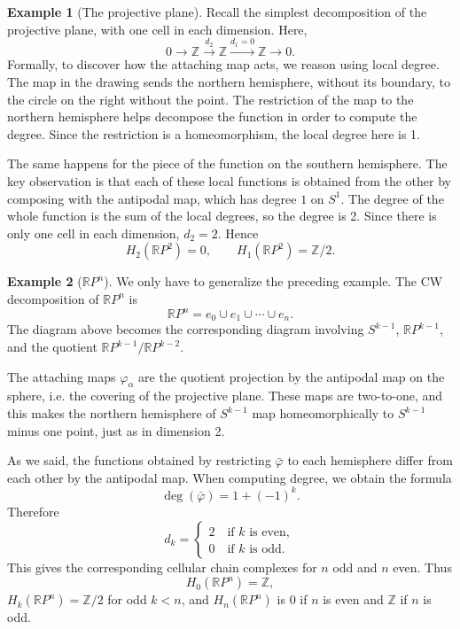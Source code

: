 \documentclass{book}
\theoremstyle{definition}
\newtheorem*{ejem}{Example}
\newcommand{\R}{\mathbb{R}}
\newcommand{\Z}{\mathbb{Z}}
\begin{document}
\begin{ejem}[The projective plane]
Recall the simplest decomposition of the projective plane,
with one cell in each dimension. Here,
$$
0\to\Z\xrightarrow{d_2}\Z\xrightarrow{d_1=0}\Z\to0.
$$
Formally, to discover how the attaching map acts, we reason
using local degree. The map in the drawing sends the northern
hemisphere, without its boundary, to the circle on the right
without the point. The restriction of the map to the northern
hemisphere helps decompose the function in order to compute
the degree. Since the restriction is a homeomorphism, the
local degree here is 1.

The same happens for the piece of the function on the
southern hemisphere. The key observation is that each of
these local functions is obtained from the other by composing
with the antipodal map, which has degree $1$ on $S^1$. The
degree of the whole function is the sum of the local degrees,
so the degree is 2. Since there is only one cell in each
dimension, $d_2=2$. Hence
$$
H_2(\R P^2)=0,
\qquad
H_1(\R P^2)=\Z/2.
$$
\end{ejem}

\begin{ejem}[$\R P^n$]
We only have to generalize the preceding example. The CW
decomposition of $\R P^n$ is
$$
\R P^n=e_0\cup e_1\cup\cdots\cup e_n.
$$
The diagram above becomes the corresponding diagram involving
$S^{k-1}$, $\mathbb RP^{k-1}$, and the quotient
$\mathbb RP^{k-1}/\mathbb RP^{k-2}$.

The attaching maps $\varphi_\alpha$ are the quotient
projection by the antipodal map on the sphere, i.e. the
covering of the projective plane. These maps are two-to-one,
and this makes the northern hemisphere of $S^{k-1}$ map
homeomorphically to $S^{k-1}$ minus one point, just as in
dimension 2.

As we said, the functions obtained by restricting
$\bar\varphi$ to each hemisphere differ from each other by the
antipodal map. When computing degree, we obtain the formula
$$
\deg(\bar\varphi)=1+(-1)^k.
$$
Therefore
$$
d_k=\begin{cases}
2\quad\text{if }k\text{ is even},\\
0\quad\text{if }k\text{ is odd}.
\end{cases}
$$
This gives the corresponding cellular chain complexes for
$n$ odd and $n$ even. Thus
$$
H_0(\R P^n)=\Z,
$$
$H_k(\R P^n)=\Z/2$ for odd $k<n$, and $H_n(\R P^n)$ is $0$
if $n$ is even and $\Z$ if $n$ is odd.
\end{ejem}
\end{document}
